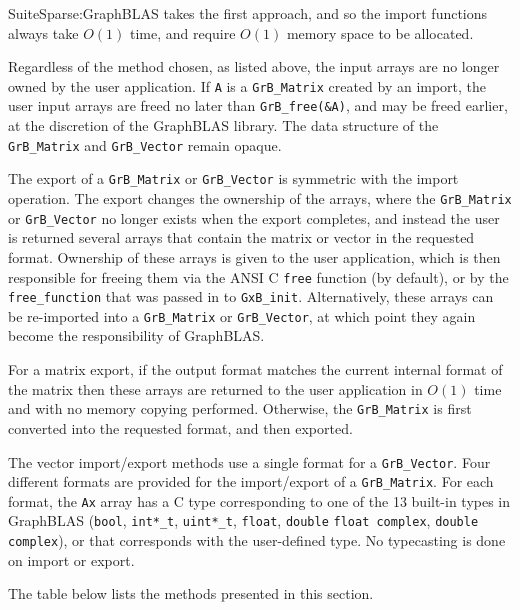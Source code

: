 \documentclass[12pt]{article}
\begin{document}
SuiteSparse:GraphBLAS takes the first approach, and so the import functions
always take $O(1)$ time, and require $O(1)$ memory space to be allocated.

Regardless of the method chosen, as listed above, the input arrays are no
longer owned by the user application.  If \verb'A' is a \verb'GrB_Matrix'
created by an import, the user input arrays are freed no later than
\verb'GrB_free(&A)', and may be freed earlier, at the discretion of the
GraphBLAS library.  The data structure of the \verb'GrB_Matrix' and
\verb'GrB_Vector' remain opaque.

The export of a \verb'GrB_Matrix' or \verb'GrB_Vector' is symmetric with the
import operation.  The export changes the ownership of the arrays, where the
\verb'GrB_Matrix' or \verb'GrB_Vector' no longer exists when the export
completes, and instead the user is returned several arrays that contain the
matrix or vector in the requested format.  Ownership of these arrays is given
to the user application, which is then responsible for freeing them via the
ANSI C \verb'free' function (by default), or by the \verb'free_function' that
was passed in to \verb'GxB_init'.  Alternatively, these arrays can be
re-imported into a \verb'GrB_Matrix' or \verb'GrB_Vector', at which point they
again become the responsibility of GraphBLAS.

For a matrix export, if the output format matches the current internal format
of the matrix then these arrays are returned to the user application in $O(1)$
time and with no memory copying performed.  Otherwise, the \verb'GrB_Matrix' is
first converted into the requested format, and then exported.

The vector import/export methods use a single format for a \verb'GrB_Vector'.
Four different formats are provided for the import/export of a
\verb'GrB_Matrix'.  For each format, the \verb'Ax' array has a C type
corresponding to one of the 13 built-in types in GraphBLAS (\verb'bool',
\verb'int*_t', \verb'uint*_t',
\verb'float', \verb'double'
\verb'float complex', \verb'double complex'), or that
corresponds with the user-defined type.  No typecasting is done on import or
export.

The table below lists the methods presented in this section.
\end{document}
